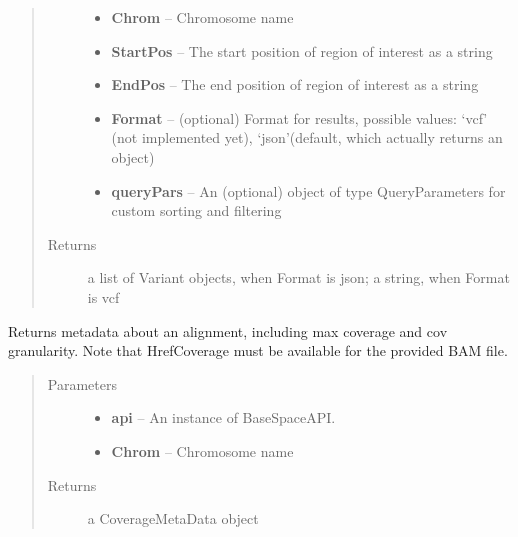 \documentclass[letterpaper,10pt,english]{sphinxmanual}
\begin{document}
\begin{fulllineitems}
\begin{fulllineitems}
\begin{quote}
\begin{description}
\begin{itemize}
\item {} 
\textbf{Chrom} -- Chromosome name

\item {} 
\textbf{StartPos} -- The start position of region of interest as a string

\item {} 
\textbf{EndPos} -- The end position of region of interest as a string

\item {} 
\textbf{Format} -- (optional) Format for results, possible values: `vcf' (not implemented yet), `json'(default, which actually returns an object)

\item {} 
\textbf{queryPars} -- An (optional) object of type QueryParameters for custom sorting and filtering

\end{itemize}

\item[{Returns}] \leavevmode
a list of Variant objects, when Format is json; a string, when Format is vcf

\end{description}\end{quote}

\end{fulllineitems}


\begin{fulllineitems}
\label{Available modules:BaseSpacePy.model.File.File.getCoverageMeta}
Returns metadata about an alignment, including max coverage and cov granularity.        
Note that HrefCoverage must be available for the provided BAM file.
\begin{quote}\begin{description}
\item[{Parameters}] \leavevmode\begin{itemize}
\item {} 
\textbf{api} -- An instance of BaseSpaceAPI.

\item {} 
\textbf{Chrom} -- Chromosome name

\end{itemize}

\item[{Returns}] \leavevmode
a CoverageMetaData object


\end{description}
\end{quote}
\end{fulllineitems}
\end{fulllineitems}
\end{document}
